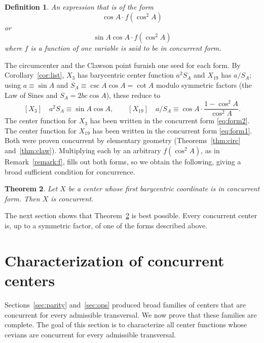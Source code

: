 \documentclass[12pt,a4paper]{amsart}
\newtheorem{theorem}{Theorem} [section]
\newtheorem{definition}[theorem]{Definition}
\theoremstyle{remark}
\begin{document}
\begin{definition}
An expression that is of the form
\begin{equation}
\label{eq:form1}
\cos A\cdot f(\cos^2A)
\end{equation}
or
\begin{equation}
\label{eq:form2}
\sin A\cos A\cdot f(\cos^2A)
\end{equation}
where $f$ is a function of one variable
is said to be in \emph{concurrent form}.
\end{definition}

The circumcenter and the Clawson point furnish one seed for each form. By
Corollary~\ref{cor:list}, $X_3$ has barycentric center function $a^2S_A$ and
$X_{19}$ has $a/S_A$; using $a\equiv\sin A$ and $S_A\equiv\csc A\cos A=\cot A$ modulo
symmetric factors (the Law of Sines and $S_A=2bc\cos A$), these reduce to
\[
  [X_3]\quad a^2S_A\equiv \sin A\cos A,\qquad
  [X_{19}]\quad a/S_A \equiv \cos A\cdot\frac{1-\cos^2A}{\cos^2A}.
\]
The center function for $X_3$ has been written in the concurrent form \eqref{eq:form2}.
The center function for $X_{19}$ has been written in the concurrent form \eqref{eq:form1}.
Both were
proven concurrent by elementary geometry (Theorems~\ref{thm:circ}
and~\ref{thm:claw}). Multiplying each by an arbitrary $f(\cos^2A)$, as in
Remark~\ref{remark:f}, fills out both forms, so we obtain the following,
giving a broad sufficient condition for concurrence.

\begin{theorem}
\label{thm:conc}
Let $X$ be a center whose first barycentric coordinate is in concurrent form.
Then $X$ is concurrent.
\end{theorem}

The next section shows that Theorem~\ref{thm:conc} is best possible.
Every concurrent center is, up to a symmetric factor, of one of the
forms described above.

\section{Characterization of concurrent centers}
\label{sec:universal}

Sections~\ref{sec:parity} and~\ref{sec:ops} produced broad families of centers that are concurrent for every
admissible transversal.  We now prove that these families are complete.  The goal
of this section is to characterize all center functions whose cevians are
concurrent for every admissible transversal.
\end{document}

